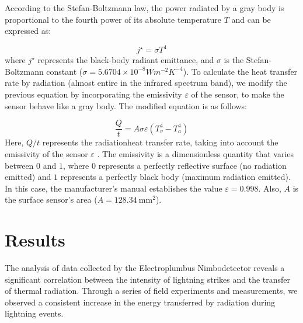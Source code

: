 \documentclass[portuguese]{cenarticle}
\begin{document}
According to the Stefan-Boltzmann law, the power radiated by a gray body is proportional to the fourth power of its absolute temperature $T$ and can be expressed as:

\begin{equation}\label{StefanBoltzmannLaw}
  j^{\star}=\sigma T^{4}
\end{equation}
%
\noindent where $j^{\star}$ represents the black-body radiant emittance, and $\sigma$ is the Stefan-Boltzmann constant ($\sigma=5.6704\times10^{-8} Wm^{-2}K^{-4}$).
%
To calculate the heat transfer rate by radiation (almost entire in the infrared spectrum band), we modify the previous equation by incorporating the emissivity $\varepsilon$ of the sensor, to make the sensor behave like a gray body. The modified equation is as follows:

\begin{equation}
  \frac{Q}{t}=A\sigma\varepsilon (T_{v}^{4} - T_{a}^{4})
\end{equation}
%
Here, $Q \slash t$ represents the radiationheat transfer rate, taking into account the emissivity of the sensor $\varepsilon$ . The emissivity is a dimensionless quantity that varies between $0$ and $1$, where $0$ represents a perfectly reflective surface (no radiation emitted) and $1$ represents a perfectly black body (maximum radiation emitted). In this case, the manufacturer's manual establishes the value $\varepsilon = 0.998$. Also, $A$ is the surface sensor's area ($A=\SI{128.34}{\milli\meter^2}$).

\section{Results}

The analysis of data collected by the Electroplumbus Nimbodetector reveals a significant correlation between the intensity of lightning strikes and the transfer of thermal radiation. Through a series of field experiments and measurements, we observed a consistent increase in the energy transferred by radiation during lightning events.


 
\end{document}
